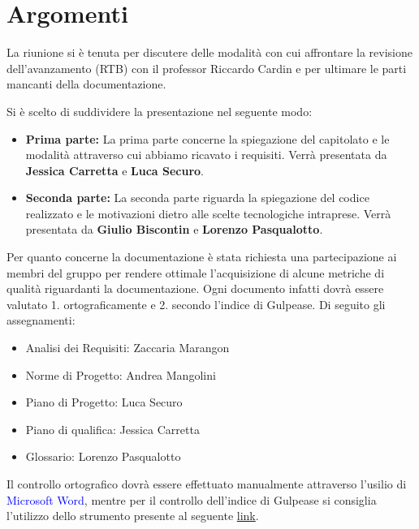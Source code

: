 \section{Argomenti} \label{sec:argomenti}
La riunione si è tenuta per discutere delle modalità con cui affrontare la revisione dell'avanzamento (RTB) con il professor Riccardo Cardin e per ultimare le parti mancanti della documentazione.

Si è scelto di suddividere la presentazione nel seguente modo:

\begin{itemize}
    \item \textbf{Prima parte:} La prima parte concerne la spiegazione del capitolato e le modalità attraverso cui abbiamo ricavato i requisiti. Verrà presentata da \textbf{Jessica Carretta} e \textbf{Luca Securo}.
    \item \textbf{Seconda parte:} La seconda parte riguarda la spiegazione del codice realizzato e le motivazioni dietro alle scelte tecnologiche intraprese. Verrà presentata da \textbf{Giulio Biscontin} e \textbf{Lorenzo Pasqualotto}.
\end{itemize}

Per quanto concerne la documentazione è stata richiesta una partecipazione ai membri del gruppo per rendere ottimale l'acquisizione di alcune metriche di qualità riguardanti la documentazione. Ogni documento infatti dovrà essere valutato 1. ortograficamente e 2. secondo l'indice di Gulpease. Di seguito gli assegnamenti:
\begin{itemize}
    \item Analisi dei Requisiti: Zaccaria Marangon
    \item Norme di Progetto: Andrea Mangolini
    \item Piano di Progetto: Luca Securo
    \item Piano di qualifica: Jessica Carretta
    \item Glossario: Lorenzo Pasqualotto
\end{itemize}

Il controllo ortografico dovrà essere effettuato manualmente attraverso l'usilio di \textcolor{blue}{Microsoft Word}, mentre per il controllo dell'indice di Gulpease si consiglia l'utilizzo dello strumento presente al seguente \href{https://www.dogmadynamics.com/calcolo-indice-lettura-facile.html}{link}.